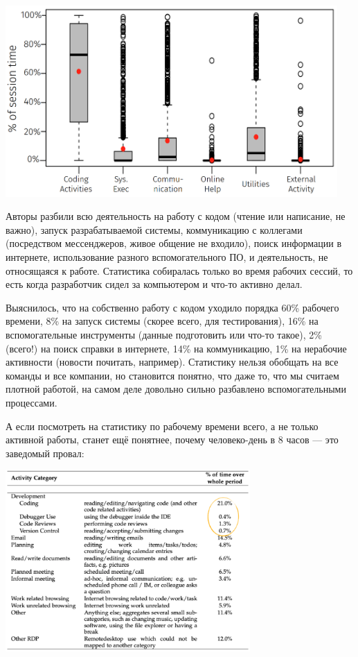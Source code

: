 \documentclass{../../text-style}
\begin{document}
\begin{center}
    \includegraphics[width=0.95\textwidth]{timeSpentDuringWorkingSession.png}
\end{center}

Авторы разбили всю деятельность на работу с кодом (чтение или написание, не важно), запуск разрабатываемой системы, коммуникацию с коллегами (посредством мессенджеров, живое общение не входило), поиск информации в интернете, использование разного вспомогательного ПО, и деятельность, не относящаяся к работе. Статистика собиралась только во время рабочих сессий, то есть когда разработчик сидел за компьютером и что-то активно делал.

Выяснилось, что на собственно работу с кодом уходило порядка 60\% рабочего времени, 8\% на запуск системы (скорее всего, для тестирования), 16\% на вспомогательные инструменты (данные подготовить или что-то такое), 2\% (всего!) на поиск справки в интернете, 14\% на коммуникацию, 1\% на нерабочие активности (новости почитать, например). Статистику нельзя обобщать на все команды и все компании, но становится понятно, что даже то, что мы считаем плотной работой, на самом деле довольно сильно разбавлено вспомогательными процессами.

А если посмотреть на статистику по рабочему времени всего, а не только активной работы, станет ещё понятнее, почему человеко-день в 8 часов --- это заведомый провал:

\begin{center}
    \includegraphics[width=0.7\textwidth]{timeSpentTotal.png}
\end{center}
\end{document}
